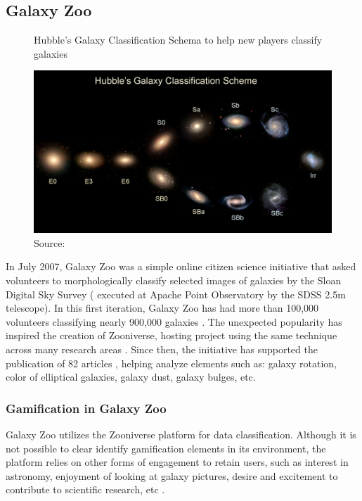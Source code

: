 \subsection{Galaxy Zoo}

\begin{figure}[ht]
    \centering
    \caption{Hubble's Galaxy Classification Schema to help new players classify galaxies}
    \includegraphics[width=0.8\linewidth]{images/background/galaxyzoo-training.jpg}
    \caption*{Source: \cite{galaxyzoo2010hubble}}
    \label{fig:galaxyzoo-hubble}
\end{figure}

In July 2007, Galaxy Zoo was a simple online citizen science initiative that asked volunteers to morphologically classify selected images of galaxies by the Sloan Digital Sky Survey (\cite{york2000sloan} executed at Apache Point Observatory by the SDSS 2.5m telescope). In this first iteration, Galaxy Zoo has had more than 100,000 volunteers classifying nearly 900,000 galaxies \cite{lintott2011galaxy}. The unexpected popularity has inspired the creation of Zooniverse, hosting project using the same technique across many research areas \cite{zooniverse2021galaxy}. Since then, the initiative has supported the publication of 82 articles \cite{galaxyzoo2021publications}, helping analyze elements such as: galaxy rotation, color of elliptical galaxies, galaxy dust, galaxy bulges, etc.

\subsubsection*{Gamification in Galaxy Zoo}

Galaxy Zoo utilizes the Zooniverse platform for data classification. Although it is not possible to clear identify gamification elements in its environment, the platform relies on other forms of engagement to retain users, such as interest in astronomy, enjoyment of looking at galaxy pictures, desire and excitement to contribute to scientific research, etc \cite{raddick2009galaxy}.

